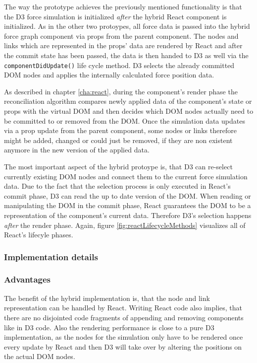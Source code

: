 The way the prototype achieves the previously mentioned functionality is that the D3 force simulation is initialized \emph{after} the hybrid React component is initialized. As in the other two protoypes, all force data is passed into the hybrid force graph component via props from the parent component. The nodes and links which are represented in the props' data are rendered by React and after the commit state has been passed, the data is then handed to D3 as well via the \texttt{componentDidUpdate()} life cycle method. D3 selects the already committed DOM nodes and applies the internally calculated force position data.

As described in chapter \ref{cha:react}, during the component's render phase the reconciliation algorithm compares newly applied data of the component's state or props with the virtual DOM and then decides which DOM nodes actually need to be committed to or removed from the DOM. Once the simulation data updates via a prop update from the parent component, some nodes or links therefore might be added, changed or could just be removed, if they are non existent anymore in the new version of the applied data.

The most important aspect of the hybrid protoype is, that D3 can re-select currently existing DOM nodes and connect them to the current force simulation data. Due to the fact that the selection process is only executed in React's commit phase, D3 can read the up to date version of the DOM. When reading or manipulating the DOM in the commit phase, React guarantees the DOM to be a representation of the component's current data. Therefore D3's selection happens \emph{after} the render phase. Again, figure \ref{fig:reactLifecycleMethods} visualizes all of React's lifecyle phases.

\subsubsection{Implementation details}


\subsubsection{Advantages}

The benefit of the hybrid implementation is, that the node and link representation can be handled by React. Writing React code also implies, that there are no disjointed code fragments of appending and removing components like in D3 code. Also the rendering performance is close to a pure D3 implementation, as the nodes for the simulation only have to be rendered once every update by React and then D3 will take over by altering the positions on the actual DOM nodes.

